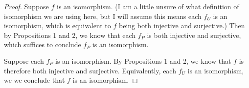 \documentclass[12pt]{article}
\theoremstyle{definition}
\newcommand{\<}{\langle}
\renewcommand{\>}{\rangle}
\begin{document}
\begin{proof}
    Suppose $f$ is an isomorphism.
    (I am a little unsure of what definition of isomorphism we are using here, but I will assume this means each $f_U$ is an isomorphism, which is equivalent to $f$ being both injective and surjective.)
    Then by Propositions 1 and 2, we know that each $f_P$ is both injective and surjective, which suffices to conclude $f_P$ is an isomorphism.

    Suppose each $f_P$ is an isomorphism.
    By Propositions 1 and 2, we know that $f$ is therefore both injective and surjective.
    Equivalently, each $f_U$ is an isomorphism, we we conclude that $f$ is an isomorphism.
\end{proof}
\end{document}
